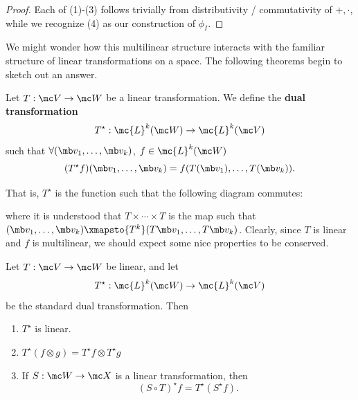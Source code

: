 \documentclass{fkbook}
\theoremstyle{snazzydefinition}
\begin{document}
\begin{proof}
  Each of (1)-(3) follows trivially from distributivity /
  commutativity of $+,\cdot$, while we recognize (4) as our
  construction of $\phi_I$.
\end{proof}
We might wonder how this multilinear structure interacts with the
familiar structure of linear transformations on a space. The following
theorems begin to sketch out an answer.
\begin{theorem}
  Let $T : \mc V \to \mc W$ be a linear transformation. We define the
  \textbf{dual transformation}
  \[
    T^\star : \mc{L}^k(\mc W) \to \mc{L}^k(\mc V)
  \]
  such that $\forall (\mb v_1, \ldots, \mb v_k)$, $f \in \mc{L}^k(\mc
  W)$
  \[
    (T^\star f)(\mb v_1, \ldots, \mb v_k) = f(T(\mb v_1), \ldots,
    T(\mb v_k)).
  \]
\end{theorem}
That is, $T^\star$ is the function such that the following diagram
commutes:
\begin{figure}[H]
  \centering
\end{figure}
where it is understood that $T\times \cdots \times T$ is the map such
that $(\mb v_1, \ldots, \mb v_k) \xmapsto{T^k} (T\mb v_1, \ldots, T\mb
v_k)$. Clearly, since $T$ is linear and $f$ is multilinear, we should
expect some nice properties to be conserved.
\begin{theorem}
  Let $T : \mc V \to \mc W$ be linear, and let
  \[
    T^\star : \mc{L}^k(\mc W) \to \mc{L}^k(\mc V)
  \]
  be the standard dual transformation. Then
  \begin{enumerate}[label=(\arabic*)]
    \item $T^\star$ is linear.
    \item $T^\star(f \otimes g) = T^\star f \otimes T^\star g$
    \item If $S : \mc W \to \mc X$ is a linear transformation, then
      \[
        (S \circ T)^\star f = T^\star (S^\star f).
      \]
  \end{enumerate}
\end{theorem}
\end{document}

